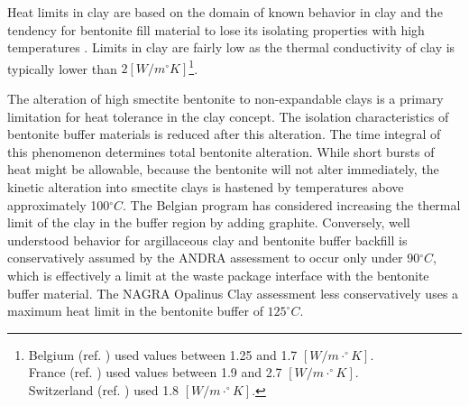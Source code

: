 Heat limits in clay are based on the domain of known behavior in clay and the 
tendency for bentonite fill material to lose its isolating properties with high 
temperatures \cite{andra_argile:_2005, pusch_alteration_1987}. Limits in clay 
are fairly low as the thermal conductivity of clay is typically lower than 
$2[W/m^{\circ}K]$\footnote{
Belgium (ref. \cite{ondraf-niras_technical_2001}) used values between 1.25 and 1.7 $[W/m\cdot^{\circ}K]$.\\
France (ref. \cite{andra_argile:_2005}) used values between 1.9 and 2.7 $[W/m\cdot^{\circ}K]$.\\
Switzerland (ref. \cite{johnson_calculations_2003}) used 1.8 $[W/m\cdot^{\circ}K]$.
}.

The alteration of high smectite bentonite to non-expandable clays is a primary 
limitation for heat tolerance in the clay concept. The isolation characteristics 
of bentonite buffer materials is reduced after this alteration. The time 
integral of this phenomenon determines total bentonite alteration. While short 
bursts of heat might be allowable, because the bentonite will not alter 
immediately, the kinetic alteration into smectite clays is hastened by 
temperatures above approximately 100$^{\circ}C$\cite{pusch_alteration_1987}. 
The Belgian program has considered increasing the thermal limit of the clay in
the buffer region by adding graphite.
Conversely, well understood behavior for argillaceous clay and bentonite buffer backfill
is conservatively assumed by the \gls{ANDRA} assessment to occur only under  
90$^{\circ}C$, which is effectively a limit at the waste package interface with 
the bentonite buffer material.\cite{andra_argile:_2005} 
The \gls{NAGRA} Opalinus Clay assessment less conservatively 
uses a maximum heat limit in the bentonite buffer of $125^{\circ}C$.
\cite{johnson_project_2002} 


% 

